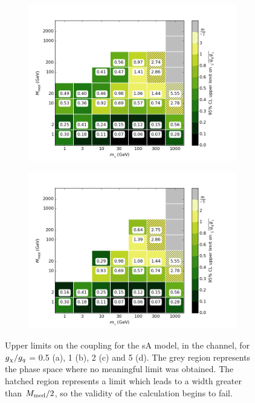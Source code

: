 \begin{figure}[h]
\begin{subfigure}[t]{0.495\textwidth}
      \includegraphics[width=1.\textwidth]{figures/grid_allpoints_SAD_rat2.png}
      \caption{}
    \end{subfigure}
    \begin{subfigure}[t]{0.495\textwidth}
      \centering
      \includegraphics[width=1.\textwidth]{figures/grid_allpoints_SAD_rat5.png}
      \caption{}
    \end{subfigure}
    \caption{Upper limits on the coupling for the sA model, in the \monoZ channel, for $g_{\chi} / g_q$ = 0.5 (a), 1 (b), 2 (c) and 5 (d). The grey region represents the phase space where no meaningful limit was obtained. The hatched region represents a limit which leads to a width greater than $M_{\mathrm{med}} / 2$, so the validity of the calculation begins to fail.}
    \label{fig:MonoZ_SAD_couplinglimit}
\end{figure}

